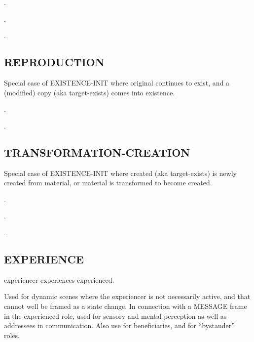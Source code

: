 \documentclass[a4paper]{article}
\newcommand{\fr}[1]{\textsf{#1}}
\newcommand{\rl}[1]{\textsf{#1}}
\begin{document}
\ex.

\ex.

\ex.

\newpage\subsection{ \fr{REPRODUCTION}}
\label{sec:REPRODUCTION}

Special case of \fr{EXISTENCE-INIT} where \rl{original} continues to exist, and
a (modified) \rl{copy} (aka \rl{target-exists}) comes into existence.

\ex.

\ex.

\newpage\subsection{ \fr{TRANSFORMATION-CREATION}}
\label{sec:TRANSFORMATION-CREATION}

Special case of \fr{EXISTENCE-INIT} where \rl{created} (aka \rl{target-exists})
is newly created from \rl{material}, or \rl{material} is transformed to become
\rl{created}.

\ex.

\ex.

\ex.

\newpage\subsection{ \fr{EXPERIENCE}}
\label{sec:EXPERIENCE}

\rl{experiencer} experiences \rl{experienced}.

Used for dynamic scenes where the \rl{experiencer} is not necessarily active,
and that cannot well be framed as a state change. In connection with a
\fr{MESSAGE} frame in the \rl{experienced} role, used for sensory and mental
perception as well as addressees in communication. Also use for beneficiaries,
and for ``bystander'' roles.
\end{document}
